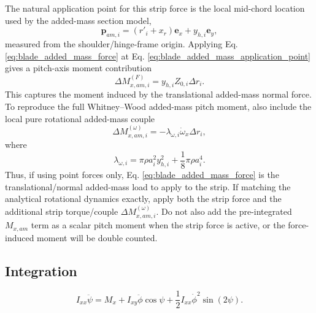 \documentclass{article}
\begin{document}
The natural application point for this strip force is the local mid-chord location used by the added-mass section model,
\begin{equation}
\mathbf{p}_{am,i}
=
(r'_i+x_r)\mathbf{e}_x + y_{h,i}\mathbf{e}_y,
\label{eq:blade_added_mass_application_point}
\end{equation}
measured from the shoulder/hinge-frame origin. Applying Eq. \ref{eq:blade_added_mass_force} at Eq. \ref{eq:blade_added_mass_application_point} gives a pitch-axis moment contribution
\begin{equation}
\Delta M^{(F)}_{x,am,i}
=
 y_{h,i} Z_{0,i}\Delta r_i.
\end{equation}
This captures the moment induced by the translational added-mass normal force. To reproduce the full Whitney--Wood added-mass pitch moment, also include the local pure rotational added-mass couple
\begin{equation}
\Delta M^{(\omega)}_{x,am,i}
= -\lambda_{\omega,i}\dot{\omega}_x\Delta r_i,
\end{equation}
where
\begin{equation}
\lambda_{\omega,i}
=
\pi\rho a_i^2 y_{h,i}^2
+
\frac{1}{8}\pi\rho a_i^4.
\end{equation}
Thus, if using point forces only, Eq. \ref{eq:blade_added_mass_force} is the translational/normal added-mass load to apply to the strip. If matching the analytical rotational dynamics exactly, apply both the strip force and the additional strip torque/couple \(\Delta M^{(\omega)}_{x,am,i}\). Do not also add the pre-integrated \(M_{x,am}\) term as a scalar pitch moment when the strip force is active, or the force-induced moment will be double counted.

\subsection{Integration} 
\begin{equation}
    I_{xx}\ddot{\psi}
    = M_x
    + I_{xy}\ddot{\phi}\cos\psi
    + \frac{1}{2} I_{xx}\dot{\phi}^{2}\sin(2\psi).
\end{equation} 
\end{document}
